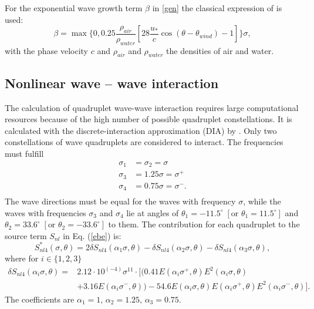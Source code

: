 For the exponential wave growth term $\beta$ in \eqref{gen} the classical expression of \citep[][]{komen1984} is used:
\begin{equation}
 \beta = \max \{ 0,0.25 \frac{\rho_{air}}{\rho_{water}} \left[28 \frac{u_\ast}{c} \cos(\theta - \theta_{wind}) -1 \right] \} \sigma,
\end{equation}
with the phase velocity $c$ and $\rho_{air}$ and $\rho_{water}$ the densities of air and water.

\subsection{Nonlinear wave -- wave interaction}

The calculation of quadruplet wave-wave interaction requires large 
computational resources because of the high number of possible quadruplet 
constellations. It is calculated with the discrete-interaction approximation 
(DIA) by \citep[][]{hasselmann1985}. Only two constellations of wave quadruplets 
are considered to interact. The frequencies must fulfill
\begin{align*}
 \sigma_1 &= \sigma_2 = \sigma \\
 \sigma_3 &= 1.25 \sigma = \sigma^+ \\
 \sigma_4 &= 0.75 \sigma = \sigma^- .\\
\end{align*}
The wave directions must be equal for the waves with frequency $\sigma$, while the waves with frequencies $\sigma_3$ and $\sigma_4$ lie at angles of $\theta_1 = -11.5^\circ \; \left[ \text{or } \theta_1 = 11.5^\circ \right]$ and $\theta_2 = 33.6^\circ \; \left[ \text{or } \theta_2 = -33.6^\circ \right]$  to them. The contribution for each quadruplet to the source term $S_{nl}$ in Eq. (\ref{ebe}) is:
\begin{equation}
 S_{nl4}^\ast (\sigma, \theta) = 2 \delta S_{nl4} (\alpha_1 \sigma, \theta) - \delta S_{nl4} (\alpha_2 \sigma, \theta) - \delta S_{nl4} (\alpha_3 \sigma, \theta),
\end{equation}
where for $i \in \{1,2,3\}$
\begin{align*}
 \delta S_{nl4} ( \alpha_i \sigma, \theta ) = & 2.12 \cdot 10^{(-4)} \sigma^{11} \cdot [ ( 0.41 E(\alpha_i \sigma^+, \theta)E^2(\alpha_i \sigma, \theta) \\
 &+ 3.16 E(\alpha_i \sigma^-, \theta) ) - 54.6 E(\alpha_i \sigma, \theta) E(\alpha_i \sigma^+, \theta) E^2(\alpha_i \sigma^-, \theta) ] .
\end{align*}
The coefficients are $\alpha_1 = 1, \, \alpha_2 = 1.25, \, \alpha_3 = 0.75$. 

